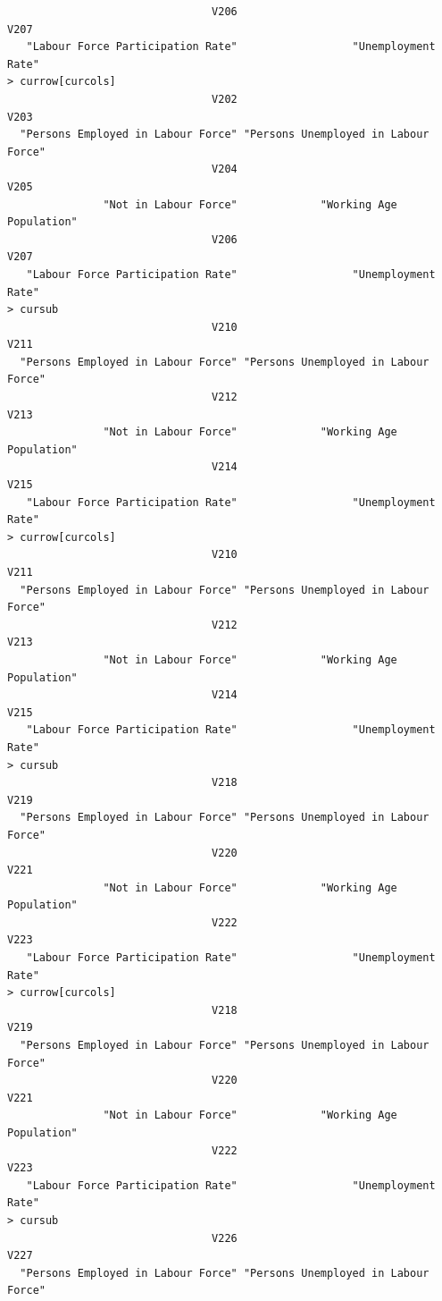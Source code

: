 \documentclass[a4paper]{article}
\begin{document}
\begin{verbatim}
                                V206                                 V207 
   "Labour Force Participation Rate"                  "Unemployment Rate" 
> currow[curcols] 
                                V202                                 V203 
  "Persons Employed in Labour Force" "Persons Unemployed in Labour Force" 
                                V204                                 V205 
               "Not in Labour Force"             "Working Age Population" 
                                V206                                 V207 
   "Labour Force Participation Rate"                  "Unemployment Rate" 
> cursub 
                                V210                                 V211 
  "Persons Employed in Labour Force" "Persons Unemployed in Labour Force" 
                                V212                                 V213 
               "Not in Labour Force"             "Working Age Population" 
                                V214                                 V215 
   "Labour Force Participation Rate"                  "Unemployment Rate" 
> currow[curcols] 
                                V210                                 V211 
  "Persons Employed in Labour Force" "Persons Unemployed in Labour Force" 
                                V212                                 V213 
               "Not in Labour Force"             "Working Age Population" 
                                V214                                 V215 
   "Labour Force Participation Rate"                  "Unemployment Rate" 
> cursub 
                                V218                                 V219 
  "Persons Employed in Labour Force" "Persons Unemployed in Labour Force" 
                                V220                                 V221 
               "Not in Labour Force"             "Working Age Population" 
                                V222                                 V223 
   "Labour Force Participation Rate"                  "Unemployment Rate" 
> currow[curcols] 
                                V218                                 V219 
  "Persons Employed in Labour Force" "Persons Unemployed in Labour Force" 
                                V220                                 V221 
               "Not in Labour Force"             "Working Age Population" 
                                V222                                 V223 
   "Labour Force Participation Rate"                  "Unemployment Rate" 
> cursub 
                                V226                                 V227 
  "Persons Employed in Labour Force" "Persons Unemployed in Labour Force" 

\end{verbatim}
\end{document}
